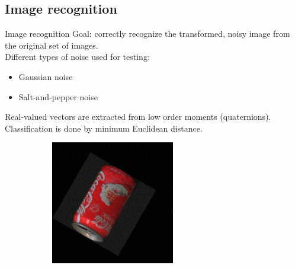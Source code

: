 \documentclass{beamer}
\begin{document}
\subsection{Image recognition}
\begin{frame}{Image recognition}
    \vskip 5mm
Goal: correctly recognize the transformed, noisy image from the original set of images. \\
Different types of noise used for testing:
\begin{itemize}
    \item Gaussian noise
    \item Salt-and-pepper noise
\end{itemize}
Real-valued vectors are extracted from low order moments (quaternions). Classification is done by minimum Euclidean distance.
\begin{figure}[tbp]
    \begin{subfigure}{0.25\textwidth}
        \centering
    \includegraphics[width=\textwidth]{figures/noise/gauss5.png}
    \end{subfigure}
    \begin{subfigure}{0.25\textwidth}
        \centering

\end{subfigure}
\end{figure}
\end{frame}
\end{document}
